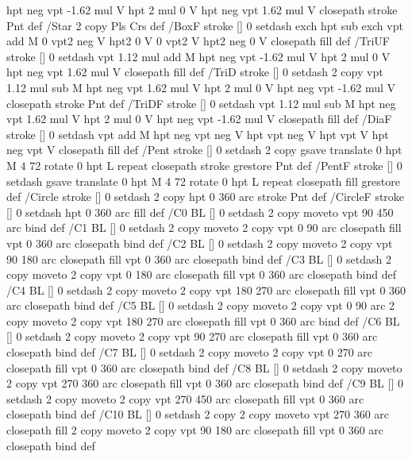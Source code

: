 {{{  hpt neg vpt -1.62 mul V
  hpt 2 mul 0 V
  hpt neg vpt 1.62 mul V closepath stroke
  Pnt  } def
/Star { 2 copy Pls Crs } def
/BoxF { stroke [] 0 setdash exch hpt sub exch vpt add M
  0 vpt2 neg V  hpt2 0 V  0 vpt2 V
  hpt2 neg 0 V  closepath fill } def
/TriUF { stroke [] 0 setdash vpt 1.12 mul add M
  hpt neg vpt -1.62 mul V
  hpt 2 mul 0 V
  hpt neg vpt 1.62 mul V closepath fill } def
/TriD { stroke [] 0 setdash 2 copy vpt 1.12 mul sub M
  hpt neg vpt 1.62 mul V
  hpt 2 mul 0 V
  hpt neg vpt -1.62 mul V closepath stroke
  Pnt  } def
/TriDF { stroke [] 0 setdash vpt 1.12 mul sub M
  hpt neg vpt 1.62 mul V
  hpt 2 mul 0 V
  hpt neg vpt -1.62 mul V closepath fill} def
/DiaF { stroke [] 0 setdash vpt add M
  hpt neg vpt neg V hpt vpt neg V
  hpt vpt V hpt neg vpt V closepath fill } def
/Pent { stroke [] 0 setdash 2 copy gsave
  translate 0 hpt M 4 {72 rotate 0 hpt L} repeat
  closepath stroke grestore Pnt } def
/PentF { stroke [] 0 setdash gsave
  translate 0 hpt M 4 {72 rotate 0 hpt L} repeat
  closepath fill grestore } def
/Circle { stroke [] 0 setdash 2 copy
  hpt 0 360 arc stroke Pnt } def
/CircleF { stroke [] 0 setdash hpt 0 360 arc fill } def
/C0 { BL [] 0 setdash 2 copy moveto vpt 90 450  arc } bind def
/C1 { BL [] 0 setdash 2 copy        moveto
       2 copy  vpt 0 90 arc closepath fill
               vpt 0 360 arc closepath } bind def
/C2 { BL [] 0 setdash 2 copy moveto
       2 copy  vpt 90 180 arc closepath fill
               vpt 0 360 arc closepath } bind def
/C3 { BL [] 0 setdash 2 copy moveto
       2 copy  vpt 0 180 arc closepath fill
               vpt 0 360 arc closepath } bind def
/C4 { BL [] 0 setdash 2 copy moveto
       2 copy  vpt 180 270 arc closepath fill
               vpt 0 360 arc closepath } bind def
/C5 { BL [] 0 setdash 2 copy moveto
       2 copy  vpt 0 90 arc
       2 copy moveto
       2 copy  vpt 180 270 arc closepath fill
               vpt 0 360 arc } bind def
/C6 { BL [] 0 setdash 2 copy moveto
      2 copy  vpt 90 270 arc closepath fill
              vpt 0 360 arc closepath } bind def
/C7 { BL [] 0 setdash 2 copy moveto
      2 copy  vpt 0 270 arc closepath fill
              vpt 0 360 arc closepath } bind def
/C8 { BL [] 0 setdash 2 copy moveto
      2 copy vpt 270 360 arc closepath fill
              vpt 0 360 arc closepath } bind def
/C9 { BL [] 0 setdash 2 copy moveto
      2 copy  vpt 270 450 arc closepath fill
              vpt 0 360 arc closepath } bind def
/C10 { BL [] 0 setdash 2 copy 2 copy moveto vpt 270 360 arc closepath fill
       2 copy moveto
       2 copy vpt 90 180 arc closepath fill
               vpt 0 360 arc closepath } bind def
}}
